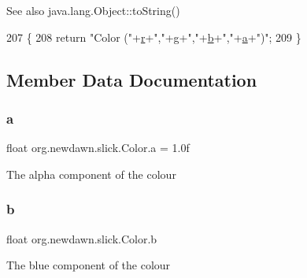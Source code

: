 \begin{DoxySeeAlso}{See also}
java.\+lang.\+Object\+::to\+String() 
\end{DoxySeeAlso}

\begin{DoxyCode}
207                              \{
208         \textcolor{keywordflow}{return} \textcolor{stringliteral}{"Color ("}+\mbox{\hyperlink{classorg_1_1newdawn_1_1slick_1_1_color_ac07fa95108064b044dcf9a53e95dcb48}{r}}+\textcolor{stringliteral}{","}+\mbox{\hyperlink{classorg_1_1newdawn_1_1slick_1_1_color_aa6ebff7c102a1476e7b511a78397b753}{g}}+\textcolor{stringliteral}{","}+\mbox{\hyperlink{classorg_1_1newdawn_1_1slick_1_1_color_a8c0cef152e16438fee852a97e50ef7a5}{b}}+\textcolor{stringliteral}{","}+\mbox{\hyperlink{classorg_1_1newdawn_1_1slick_1_1_color_ab9288c822ff7614a77c887eb8c2595a7}{a}}+\textcolor{stringliteral}{")"};
209     \}
\end{DoxyCode}


\subsection{Member Data Documentation}
\mbox{\label{classorg_1_1newdawn_1_1slick_1_1_color_ab9288c822ff7614a77c887eb8c2595a7}} 
\subsubsection{\texorpdfstring{a}{a}}
{\footnotesize\ttfamily float org.\+newdawn.\+slick.\+Color.\+a = 1.\+0f}

The alpha component of the colour \mbox{\label{classorg_1_1newdawn_1_1slick_1_1_color_a8c0cef152e16438fee852a97e50ef7a5}} 
\subsubsection{\texorpdfstring{b}{b}}
{\footnotesize\ttfamily float org.\+newdawn.\+slick.\+Color.\+b}

The blue component of the colour \mbox{\label{classorg_1_1newdawn_1_1slick_1_1_color_ac9ec721980ab1c388e82e2f8e584f002}} 
